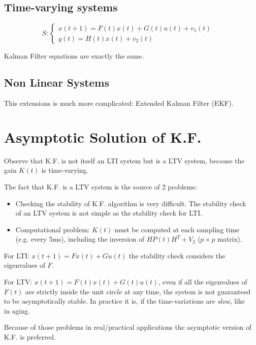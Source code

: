 \subsection{Time-varying systems}

\[
    S: \begin{cases}
        x(t+1) = F(t)x(t) + G(t)u(t) + v_1(t) \\
        y(t) = H(t)x(t) + v_2(t)
    \end{cases}
\]

Kalman Filter equations are exactly the same.

\subsection{Non Linear Systems}

This extensions is much more complicated: Extended Kalman Filter (EKF).

\section{Asymptotic Solution of K.F.}

Observe that K.F. is not itself an LTI system but is a LTV system, because the gain $K(t)$ is time-varying.

The fact that K.F. is a LTV system is the source of 2 problems:
\begin{itemize}
    \item Checking the stability of K.F. algorithm is very difficult. The stability check of an LTV system is not simple as the stability check for LTI.
    \item Computational problem: $K(t)$ must be computed at each sampling time (e.g. every 5ms), including the inversion of $HP(t)H^T+V_2$ ($p\times p$ matrix).
\end{itemize}

\begin{remark}
    For LTI: $x(t+1) = Fx(t) + Gu(t)$ the stability check considers the eigenvalues of $F$.

    For LTV: $x(t+1) = F(t)x(t) + G(t)u(t)$, even if all the eigenvalues of $F(t)$ are strictly inside the unit circle at any time, the system is not guaranteed to be asymptotically stable.
    In practice it is, if the time-variations are \emph{slow}, like in aging.
\end{remark}

Because of those problems in real/practical applications the asymptotic version of K.F. is preferred.

